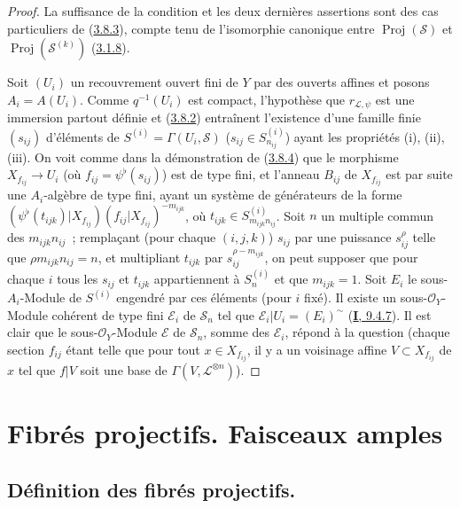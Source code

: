 \begin{proof}
La suffisance de la condition et les deux dernières assertions sont des cas
particuliers de (\hyperref[II.3.8.3-fr]{3.8.3}), compte tenu de l'isomorphie
canonique entre $\operatorname{Proj}(\mathcal{S})$ et
$\operatorname{Proj}(\mathcal{S}^{(k)})$
(\hyperref[II.3.1.8-fr]{3.1.8}).

Soit $(U_i)$ un recouvrement ouvert fini de $Y$ par des ouverts affines et
posons $A_i=A(U_i)$. Comme $q^{-1}(U_i)$ est compact, l'hypothèse que
$r_{\mathcal{L},\psi}$ est une immersion partout définie et
(\hyperref[II.3.8.2-fr]{3.8.2}) entraînent l'existence d'une famille finie
$(s_{ij})$ d'éléments de
$S^{(i)}=\Gamma(U_i,\mathcal{S})$ ($s_{ij}\in S_{n_{ij}}^{(i)}$) ayant les
propriétés (i), (ii), (iii). On voit comme dans la démonstration de
(\hyperref[II.3.8.4-fr]{3.8.4}) que le morphisme $X_{f_{ij}}\to U_i$ (où
$f_{ij}=\psi^\flat(s_{ij})$) est de type fini, et l'anneau $B_{ij}$ de
$X_{f_{ij}}$ est par suite une $A_i$-algèbre de type fini, ayant un système de
générateurs de la forme
$(\psi^\flat(t_{ijk})|X_{f_{ij}})(f_{ij}|X_{f_{ij}})^{-m_{ijk}}$, où
$t_{ijk}\in S_{m_{ijk}n_{ij}}^{(i)}$. Soit $n$ un multiple commun des
$m_{ijk}n_{ij}$~; remplaçant (pour chaque $(i,j,k)$) $s_{ij}$ par une
puissance $s_{ij}^\rho$ telle que $\rho m_{ijk}n_{ij}=n$, et multipliant
$t_{ijk}$ par $s_{ij}^{\rho-m_{ijk}}$, on peut supposer que pour chaque $i$
tous les $s_{ij}$ et $t_{ijk}$ appartiennent à $S_n^{(i)}$ et que
$m_{ijk}=1$. Soit $E_i$ le sous-$A_i$-Module de $S^{(i)}$ engendré par ces
éléments (pour $i$ fixé). Il existe un sous-$\mathcal{O}_Y$-Module cohérent de
type
fini $\mathcal{E}_i$ de $\mathcal{S}_n$ tel que
$\mathcal{E}_i|U_i=(E_i)^{\sim}$
(\hyperref[I.9.4.7-fr]{\textbf{I}, 9.4.7}). Il est clair que le
sous-$\mathcal{O}_Y$-Module $\mathcal{E}$ de $\mathcal{S}_n$, somme des
$\mathcal{E}_i$, répond à la question (chaque section $f_{ij}$ étant telle
que pour tout $x\in X_{f_{ij}}$, il y a un voisinage affine
$V\subset X_{f_{ij}}$ de $x$ tel que $f|V$ soit une base de
$\Gamma(V,\mathcal{L}^{\otimes n})$).
\end{proof}

\section{Fibrés projectifs. Faisceaux amples}
\label{section:II.4-fr}

\subsection{Définition des fibrés projectifs.}
\label{subsection:II.4.1-fr}


